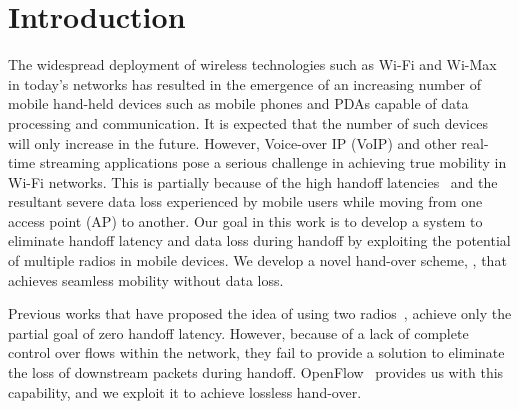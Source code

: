 \section{Introduction}

The widespread deployment of wireless technologies such as Wi-Fi and Wi-Max 
in today's networks has resulted in the emergence of an increasing number 
of mobile hand-held devices such as mobile phones and PDAs capable of data 
processing and communication. It is expected that the number of such devices 
will only increase in the future. However, Voice-over IP (VoIP) and other 
real-time streaming applications pose a serious challenge in achieving true 
mobility in Wi-Fi networks. This is partially because of the high handoff 
latencies~\cite{956990} and the resultant severe data loss experienced by mobile users 
while moving from one access point (AP) to another. Our goal in this work 
is to develop a system to eliminate handoff latency and data loss during 
handoff by exploiting the potential of multiple radios in mobile devices. 
We develop a novel hand-over scheme, {\bf \sys{}}, that achieves seamless mobility 
without data loss. 

Previous works that have proposed the idea of using two radios~\cite{brik}, achieve only
the partial goal of zero handoff latency. However, because of a lack of
complete control over flows within the network, they fail to provide a solution to
eliminate the loss of downstream packets during handoff. OpenFlow~\cite{openflow} provides us with 
this capability, and we exploit it to achieve lossless hand-over.

